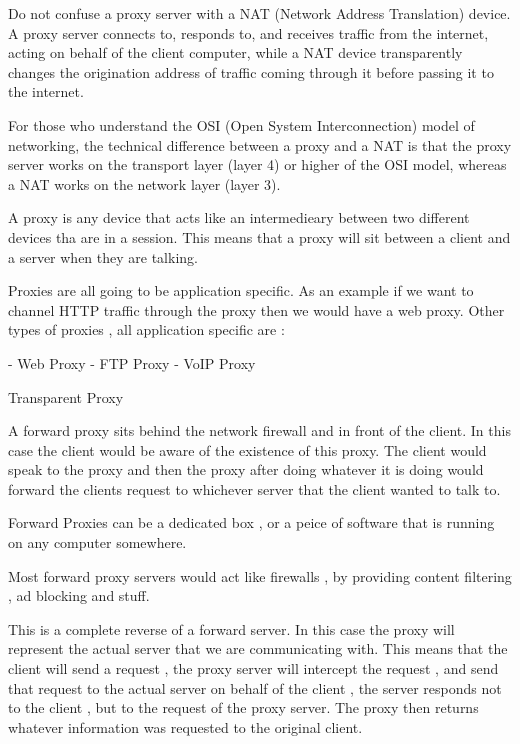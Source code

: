 Do not confuse a proxy server with a NAT (Network Address Translation) device. A
proxy server connects to, responds to, and receives traffic from the internet,
acting on behalf of the client computer, while a NAT device transparently
changes the origination address of traffic coming through it before passing it
to the internet.

For those who understand the OSI (Open System Interconnection) model of
networking, the technical difference between a proxy and a NAT is that the proxy
server works on the transport layer (layer 4) or higher of the OSI model,
whereas a NAT works on the network layer (layer 3).

A proxy is any device that acts like an intermedieary between two different
devices tha are in a session. This means that a proxy will sit between a client
and a server when they are talking.

Proxies are all going to be application specific. As an example if we want to
channel HTTP traffic through the proxy then we would have a web proxy. Other
types of proxies , all application specific are :

- Web Proxy
- FTP Proxy
- VoIP Proxy


Transparent Proxy



A forward proxy sits behind the network firewall and in front of the client. In
this case the client would be aware of the existence of this proxy. The client
would speak to the proxy and then the proxy after doing whatever it is doing
would forward the clients request to whichever server that the client wanted to
talk to.

Forward Proxies can be a dedicated box , or a peice of software that is running
on any computer somewhere.

Most forward proxy servers would act like firewalls , by providing content
filtering , ad blocking and stuff.




This is a complete reverse of a forward server. In this case the proxy will
represent the actual server that we are communicating with. This means that the
client will send a request , the proxy server will intercept the request , and
send that request to the actual server on behalf of the client , the server
responds not to the client , but to the request of the proxy server. The proxy
then returns whatever information was requested to the original client.

